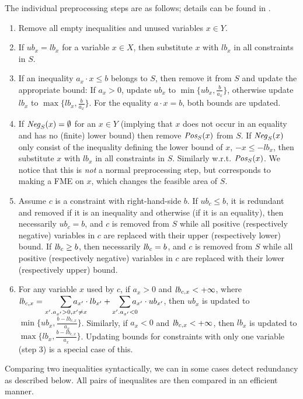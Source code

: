 The individual preprocessing steps are as follows; details can be found in \cite{MyTechRep}. 
%
\begin{enumerate} \itemsep0em
	\item Remove all empty inequalities and unused variables $x\in Y$.
%
	\item If $ub_x = lb_x$ for a variable $x\in X$, then substitute $x$ with $lb_x$ in all constraints in $S$. 
%
	\item If an inequality $a_x\cdot x \leq b$ belongs to $S$, then remove it from $S$ and update the appropriate bound: If $a_x>0$, update $ub_x$ to $\min\{ub_x,\frac{b}{a_x}\}$, otherwise update $lb_x$ to $\max\{lb_x,\frac{b}{a_x}\}$.
For the equality $a\cdot x = b$, both bounds are updated.
%
	\item If $\mathit{Neg}_S(x)=\emptyset$ for an $x\in Y$ (implying that $x$ does not occur in an equality and has no (finite) lower bound) then remove $\mathit{Pos}_S(x)$ from $S$. If $\mathit{Neg}_S(x)$ only consist of the inequality defining the lower bound of $x$, $-x\leq -lb_x$, then substitute $x$ with $lb_x$ in all constraints in $S$. Similarly w.r.t. $\mathit{Pos}_S(x)$. We notice that this is \emph{not} a normal preprocessing step, but corresponds to making a FME on $x$, which changes the feasible area of $S$. 
%
	\item Assume $c$ is a constraint with right-hand-side $b$. If ${ub}_c \leq b$, it is redundant and removed if it is an inequality and otherwise (if it is an equality), then necessarily ${ub}_c = b$, and $c$ is removed from $S$ while all positive (respectively negative) variables in $c$ are replaced with their upper (respectively lower) bound.
If $\mathit{lb}_c \geq b$, then necessarily $\mathit{lb}_c = b$, and $c$ is removed from $S$ while all positive (respectively negative) variables in $c$ are replaced with their lower (respectively upper) bound.
%
	\item For any variable $x$ used by $c$, if $a_x > 0$ and $\mathit{lb}_{c,x}<+\infty$, 
	where $\mi{lb}_{c,x} = \smashoperator[r]{\sum_{x'.a_{x'}>0, x'\neq x}}a_{x'}\cdot lb_{x'} + \smashoperator[r]{\sum_{x'.a_{x'}<0}}a_{x'}\cdot ub_{x'}$, 
	then $ub_x$ is updated to $\min\{ub_x, \frac{b-\mathit{lb}_{c,x}}{a_x}\}$. 
	Similarly, if $a_x < 0$ and $\mathit{lb}_{c,x}<+\infty$, then $lb_x$ is updated to $\max\{lb_x, \frac{b-\mathit{lb}_{c,x}}{a_x}\}$.	
	Updating bounds for constraints with only one variable (step 3) is a special case of this.
\setcounter{counterName}{\value{enumi}}
\end{enumerate}	
%
Comparing two inequalities syntactically, we can in some cases detect redundancy as described below. All pairs of inequalites are then compared in an efficient manner.
